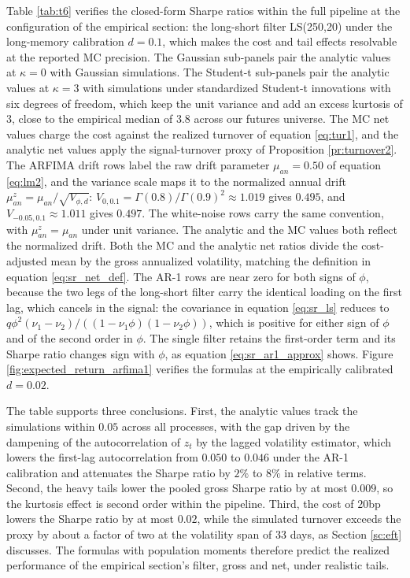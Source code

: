 \documentclass[hidelinks]{siamonline250211}
\begin{document}
Table \ref{tab:t6} verifies the closed-form Sharpe ratios within the full pipeline at the configuration of the empirical section: the long-short filter LS(250,20) under the long-memory calibration $d=0.1$, which makes the cost and tail effects resolvable at the reported MC precision. The Gaussian sub-panels pair the analytic values at $\kappa=0$ with Gaussian simulations. The Student-t sub-panels pair the analytic values at $\kappa=3$ with simulations under standardized Student-t innovations with six degrees of freedom, which keep the unit variance and add an excess kurtosis of $3$, close to the empirical median of $3.8$ across our futures universe. The MC net values charge the cost against the realized turnover of equation \eqref{eq:tur1}, and the analytic net values apply the signal-turnover proxy of Proposition \ref{pr:turnover2}. The ARFIMA drift rows label the raw drift parameter $\mu_{an}=0.50$ of equation \eqref{eq:lm2}, and the variance scale maps it to the normalized annual drift $\mu^{z}_{an} = \mu_{an}/\sqrt{V_{\phi,d}}$: $V_{0,0.1} = \Gamma(0.8)/\Gamma(0.9)^{2} \approx 1.019$ gives $0.495$, and $V_{-0.05,0.1} \approx 1.011$ gives $0.497$. The white-noise rows carry the same convention, with $\mu^{z}_{an}=\mu_{an}$ under unit variance. The analytic and the MC values both reflect the normalized drift. Both the MC and the analytic net ratios divide the cost-adjusted mean by the gross annualized volatility, matching the definition in equation \eqref{eq:sr_net_def}. The AR-1 rows are near zero for both signs of $\phi$, because the two legs of the long-short filter carry the identical loading on the first lag, which cancels in the signal: the covariance in equation \eqref{eq:sr_ls} reduces to $q\phi^{2}(\nu_{1}-\nu_{2})/\left((1-\nu_{1}\phi)(1-\nu_{2}\phi)\right)$, which is positive for either sign of $\phi$ and of the second order in $\phi$. The single filter retains the first-order term and its Sharpe ratio changes sign with $\phi$, as equation \eqref{eq:sr_ar1_approx} shows. Figure \ref{fig:expected_return_arfima1} verifies the formulas at the empirically calibrated $d=0.02$.

The table supports three conclusions. First, the analytic values track the simulations within $0.05$ across all processes, with the gap driven by the dampening of the autocorrelation of $z_{t}$ by the lagged volatility estimator, which lowers the first-lag autocorrelation from $0.050$ to $0.046$ under the AR-1 calibration and attenuates the Sharpe ratio by $2\%$ to $8\%$ in relative terms. Second, the heavy tails lower the pooled gross Sharpe ratio by at most $0.009$, so the kurtosis effect is second order within the pipeline. Third, the cost of $20$bp lowers the Sharpe ratio by at most $0.02$, while the simulated turnover exceeds the proxy by about a factor of two at the volatility span of $33$ days, as Section \ref{sc:eft} discusses. The formulas with population moments therefore predict the realized performance of the empirical section's filter, gross and net, under realistic tails.
\end{document}
